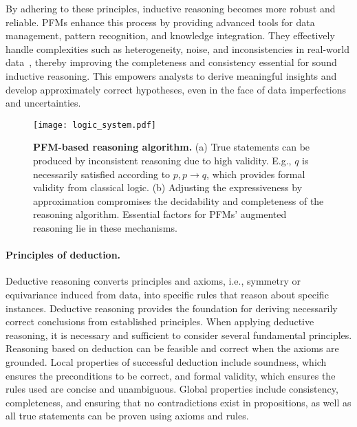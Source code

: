By adhering to these principles, inductive reasoning becomes more robust and reliable. PFMs enhance this process by providing advanced tools for data management, pattern recognition, and knowledge integration. They effectively handle complexities such as heterogeneity, noise, and inconsistencies in real-world data~\cite{vos2022towards, deem}, thereby improving the completeness and consistency essential for sound inductive reasoning. This empowers analysts to derive meaningful insights and develop approximately correct hypotheses, even in the face of data imperfections and uncertainties.
  
  
  \begin{figure*}[h]
    \centering
    \texttt{[image: logic\_system.pdf]} %
    \caption{\textbf{PFM-based reasoning algorithm.} (a) True statements can be produced by inconsistent reasoning due to high validity. E.g., $q$ is necessarily satisfied according to $p, p\rightarrow q$, which provides formal validity from classical logic. (b) Adjusting the expressiveness by approximation compromises the decidability and completeness of the reasoning algorithm. Essential factors for PFMs' augmented reasoning lie in these mechanisms.}
    \label{fig:logic_system}
  \end{figure*}
  
  
  \paragraph{Principles of deduction.} Deductive reasoning converts principles and axioms, i.e., symmetry or equivariance induced from data, into specific rules that reason about specific instances. Deductive reasoning provides the foundation for deriving necessarily correct conclusions from established principles. When applying deductive reasoning, it is necessary and sufficient to consider several fundamental principles. Reasoning based on deduction can be feasible and correct when the axioms are grounded. Local properties of successful deduction include soundness, which ensures the preconditions to be correct, and formal validity, which ensures the rules used are concise and unambiguous. Global properties include consistency, completeness, and ensuring that no contradictions exist in propositions, as well as all true statements can be proven using axioms and rules.
  
